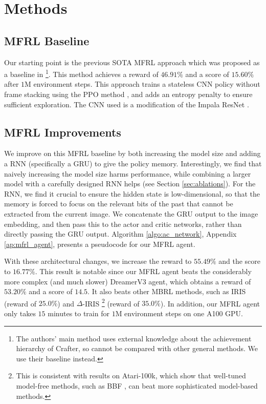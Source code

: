 \section{Methods}
\label{sec:methods}


\subsection{MFRL Baseline}
\label{sec:MFRL}

Our starting point is the previous SOTA
MFRL approach which was proposed as a baseline in
\citet{moon2024discovering}\footnote{%
The authors' main method uses external knowledge about the achievement hierarchy of Crafter, so cannot be compared with other general methods. We use their baseline instead.
}.
This method achieves a reward of $46.91\%$ and a score of $15.60\%$ after $1$M environment steps.
This approach trains a stateless CNN policy without frame stacking
using the PPO method \citep{schulman2017proximal}, and
adds an entropy penalty to ensure sufficient exploration.
The CNN used is a modification of the Impala
ResNet \citep{Espeholt2018}.


\subsection{MFRL Improvements}

We improve on this MFRL baseline
by both increasing the model size and adding a RNN (specifically a GRU) to give the policy memory.
Interestingly, we find that naively increasing the model size harms performance, while combining a larger model with a carefully designed RNN helps (see Section \ref{sec:ablations}). 
For the RNN,
we find it crucial to ensure
the hidden state is low-dimensional,
so that the memory is forced to focus on the relevant
bits of the past that cannot be extracted
from the current image.
We concatenate the GRU output to the image
embedding, and then pass this to the actor and critic networks,
rather than directly passing the GRU output. Algorithm \ref{algo:ac_network}, Appendix \ref{ap:mfrl_agent}, presents a pseudocode for our MFRL agent.


With these architectural changes,
we increase the reward to $55.49\%$ and the score to $16.77\%$.
This result is notable since our MFRL agent beats the considerably more complex (and much slower) DreamerV3 agent, which obtains a reward of $53.20\%$ and a score of $14.5$. 
It also beats other MBRL methods, such as IRIS \citep{micheli2022transformers} (reward of $25.0\%$) and $\Delta$-IRIS \citep{micheli2024efficient}
\footnote{
This is consistent with results on Atari-100k, which show that well-tuned model-free methods, such as BBF \citep{Schwarzer2023}, can beat more sophisticated model-based methods.} (reward of $35.0\%$). 
In addition, our MFRL agent only takes
$15$ minutes to train for $1$M environment
steps on one A100 GPU.

